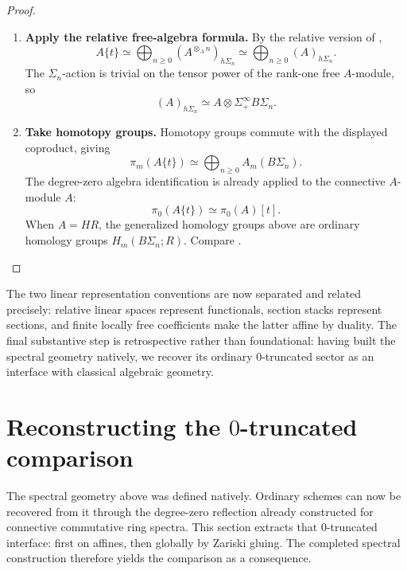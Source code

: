 \begin{proof}
\leavevmode
\begin{enumerate}[label=\textup{(\arabic*)}]
    \item \textbf{Apply the relative free-algebra formula.}
    By the relative version of
    ,
    \[
        A\{t\}
        \simeq
        \bigoplus_{n\geq0}
        (A^{\otimes_A n})_{h\Sigma_n}
        \simeq
        \bigoplus_{n\geq0}(A)_{h\Sigma_n}.
    \]
    The \(\Sigma_n\)-action is trivial on the tensor power of the rank-one
    free \(A\)-module, so
    \[
        (A)_{h\Sigma_n}
        \simeq
        A\otimes\Sigma^\infty_+B\Sigma_n.
    \]

    \item \textbf{Take homotopy groups.}
    Homotopy groups commute with the displayed coproduct, giving
    \[
        \pi_m(A\{t\})
        \simeq
        \bigoplus_{n\geq0}A_m(B\Sigma_n).
    \]
    The degree-zero algebra identification is already
     applied to the connective
    \(A\)-module \(A\):
    \[
        \pi_0(A\{t\})\simeq\pi_0(A)[t].
    \]
    When \(A=HR\), the generalized homology groups above are ordinary
    homology groups \(H_m(B\Sigma_n;R)\). Compare
    \cite{LurieHigherAlgebra,KhanBraveNewMotivicI}.
\end{enumerate}
\end{proof}

The two linear representation conventions are now separated and related
precisely: relative linear spaces represent functionals, section stacks
represent sections, and finite locally free coefficients make the latter
affine by duality. The final substantive step is retrospective rather than
foundational: having built the spectral geometry natively, we recover its
ordinary \(0\)-truncated sector as an interface with classical algebraic
geometry.

\section{Reconstructing the \texorpdfstring{$0$}{0}-truncated comparison}
\label{sec:zero-truncated-reconstruction}

The spectral geometry above was defined natively. Ordinary schemes can now be
recovered from it through the degree-zero reflection already constructed for
connective commutative ring spectra. This section extracts that \(0\)-truncated
interface: first on affines, then globally by Zariski gluing. The completed
spectral construction therefore yields the comparison as a consequence.

